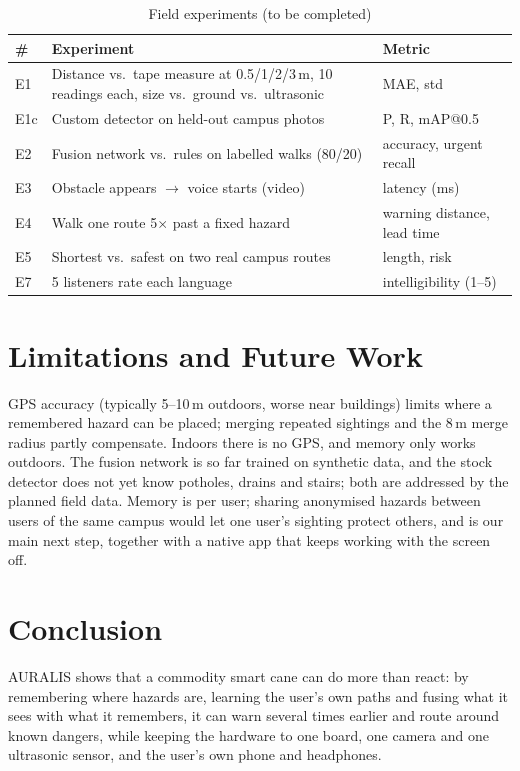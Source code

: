 \documentclass[conference]{IEEEtran}
\begin{document}
\begin{table}[t]
\caption{Field experiments (to be completed)}
\label{tab:plan}
\centering\footnotesize
\begin{tabular}{@{}lp{38mm}l@{}}
\toprule
\# & Experiment & Metric \\
\midrule
E1 & Distance vs.\ tape measure at 0.5/1/2/3\,m, 10 readings each, size vs.\ ground vs.\ ultrasonic & MAE, std \\
E1c & Custom detector on held-out campus photos & P, R, mAP@0.5 \\
E2 & Fusion network vs.\ rules on labelled walks (80/20) & accuracy, urgent recall \\
E3 & Obstacle appears $\to$ voice starts (video) & latency (ms) \\
E4 & Walk one route 5$\times$ past a fixed hazard & warning distance, lead time \\
E5 & Shortest vs.\ safest on two real campus routes & length, risk \\
E7 & 5 listeners rate each language & intelligibility (1--5) \\
\bottomrule
\end{tabular}
\end{table}

\section{Limitations and Future Work}
GPS accuracy (typically 5--10\,m outdoors, worse near buildings) limits where a remembered hazard can be placed; merging repeated sightings and the 8\,m merge radius partly compensate. Indoors there is no GPS, and memory only works outdoors. The fusion network is so far trained on synthetic data, and the stock detector does not yet know potholes, drains and stairs; both are addressed by the planned field data. Memory is per user; sharing anonymised hazards between users of the same campus would let one user's sighting protect others, and is our main next step, together with a native app that keeps working with the screen off.

\section{Conclusion}
AURALIS shows that a commodity smart cane can do more than react: by remembering where hazards are, learning the user's own paths and fusing what it sees with what it remembers, it can warn several times earlier and route around known dangers, while keeping the hardware to one board, one camera and one ultrasonic sensor, and the user's own phone and headphones.
\end{document}
